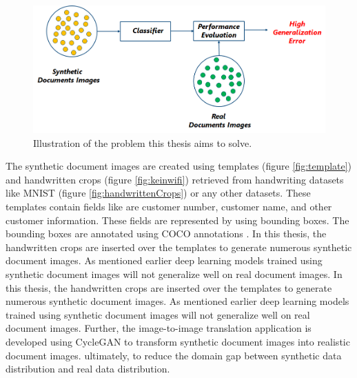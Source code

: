 \begin{figure}[H]
        \begin{center}
	    \includegraphics[scale=0.60]{images/Introduction/Problem.png}
	    \caption[Illustration of the problem this thesis aims to solve.]{Illustration of the problem this thesis aims to solve.}
	    \label{fig:Problem}
	    \end{center}
\end{figure}


The synthetic document images are created using templates (figure \ref{fig:template}) and handwritten crops (figure \ref{fig:keinwifi}) retrieved from handwriting datasets like \ac{MNIST} (figure \ref{fig:handwrittenCrops}) or any other datasets. These templates contain fields like are customer number, customer name, and other customer information. These fields are represented by using bounding boxes. The bounding boxes are annotated using \ac{COCO} annotations \cite{10.1007/978-3-319-10602-1_48}. In this thesis, the handwritten crops are inserted over the templates to generate numerous synthetic document images. As mentioned earlier deep learning models trained using synthetic document images will not generalize well on real document images. In this thesis, the handwritten crops are inserted over the templates to generate numerous synthetic document images. As mentioned earlier deep learning models trained using synthetic document images will not generalize well on real document images. Further, the image-to-image translation application is developed using \ac{CycleGAN} to transform synthetic document images into realistic document images. ultimately, to reduce the domain gap between synthetic data distribution and real data distribution. 


